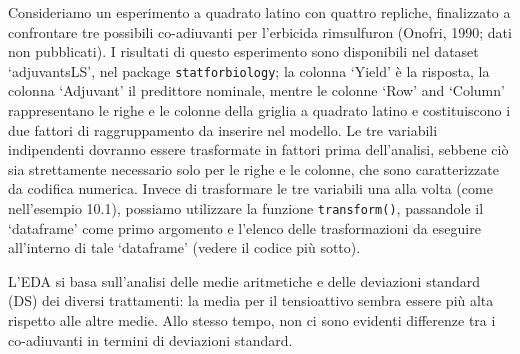 \documentclass[
  12pt,
]{book}
\begin{document}
Consideriamo un esperimento a quadrato latino con quattro repliche, finalizzato a confrontare tre possibili co-adiuvanti per l'erbicida rimsulfuron (Onofri, 1990; dati non pubblicati). I risultati di questo esperimento sono disponibili nel dataset `adjuvantsLS', nel package \texttt{statforbiology}; la colonna `Yield' è la risposta, la colonna `Adjuvant' il predittore nominale, mentre le colonne `Row' and `Column' rappresentano le righe e le colonne della griglia a quadrato latino e costituiscono i due fattori di raggruppamento da inserire nel modello. Le tre variabili indipendenti dovranno essere trasformate in fattori prima dell'analisi, sebbene ciò sia strettamente necessario solo per le righe e le colonne, che sono caratterizzate da codifica numerica. Invece di trasformare le tre variabili una alla volta (come nell'esempio 10.1), possiamo utilizzare la funzione \texttt{transform()}, passandole il `dataframe' come primo argomento e l'elenco delle trasformazioni da eseguire all'interno di tale `dataframe' (vedere il codice più sotto).

L'EDA si basa sull'analisi delle medie aritmetiche e delle deviazioni standard (DS) dei diversi trattamenti: la media per il tensioattivo sembra essere più alta rispetto alle altre medie. Allo stesso tempo, non ci sono evidenti differenze tra i co-adiuvanti in termini di deviazioni standard.
\end{document}

